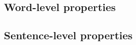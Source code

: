 











\subsection{Word-level properties}







\subsection{Sentence-level properties}








